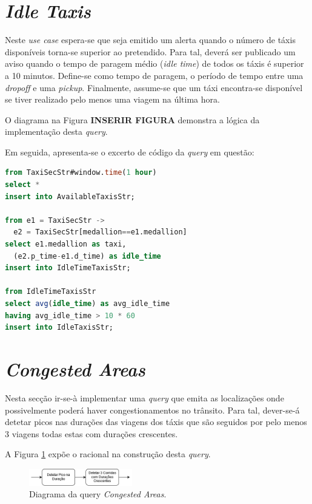 \documentclass[article]{IEEEtran}
\begin{document}
\section{\textit{Idle Taxis}}

Neste \textit{use case} espera-se que seja emitido um alerta quando o número de táxis disponíveis torna-se superior ao pretendido. Para tal, deverá ser publicado um aviso quando o tempo de paragem médio (\textit{idle time}) de todos os táxis é superior a 10 minutos. Define-se como tempo de paragem, o período de tempo entre uma \textit{dropoff} e uma \textit{pickup}. Finalmente, assume-se que um táxi encontra-se disponível se tiver realizado pelo menos uma viagem na última hora.

O diagrama na Figura \textbf{INSERIR FIGURA} demonstra a lógica da implementação desta \textit{query}.

Em seguida, apresenta-se o excerto de código da \textit{query} em questão:
\begin{lstlisting}[language=SQL]
from TaxiSecStr#window.time(1 hour)
select *
insert into AvailableTaxisStr;

from e1 = TaxiSecStr -> 
  e2 = TaxiSecStr[medallion==e1.medallion]
select e1.medallion as taxi,
  (e2.p_time-e1.d_time) as idle_time
insert into IdleTimeTaxisStr;

from IdleTimeTaxisStr
select avg(idle_time) as avg_idle_time
having avg_idle_time > 10 * 60
insert into IdleTaxisStr;
\end{lstlisting}


\section{\textit{Congested Areas}}

Nesta secção ir-se-à implementar uma \textit{query} que emita as localizações onde possivelmente poderá haver congestionamentos no trânsito. Para tal, dever-se-á detetar picos nas durações das viagens dos táxis que são seguidos por pelo menos 3 viagens todas estas com durações crescentes.

A Figura \ref{fig:congestedAreasDiagram} expõe o racional na construção desta \textit{query}.

\begin{figure}[hbtp]
    \centering
        \includegraphics[width=0.4\textwidth]{images/congestedAreas}
    \caption{Diagrama da query \textit{Congested Areas}.}
    \label{fig:congestedAreasDiagram}
\end{figure}
\end{document}
